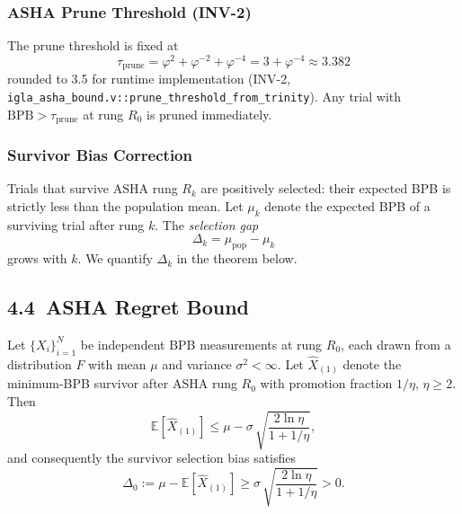 \subsubsection{ASHA Prune Threshold (INV-2)}

The prune threshold is fixed at
\[
  \tau_{\text{prune}} = \varphi^2 + \varphi^{-2} + \varphi^{-4}
    = 3 + \varphi^{-4} \approx 3.382
\]
rounded to 3.5 for runtime implementation (INV-2,
\texttt{igla\_asha\_bound.v::prune\_threshold\_from\_trinity}).
Any trial with \(\mathrm{BPB} > \tau_{\text{prune}}\) at rung \(R_0\) is
pruned immediately.

\subsubsection{Survivor Bias Correction}

Trials that survive ASHA rung \(R_k\) are positively selected: their
expected BPB is strictly less than the population mean.
Let \(\mu_k\) denote the expected BPB of a surviving trial after rung \(k\).
The \emph{selection gap}
\[
  \Delta_k = \mu_{\text{pop}} - \mu_k
\]
grows with \(k\).  We quantify \(\Delta_k\) in the theorem below.

\subsection{4.4\ ASHA Regret Bound}\label{sec:ch26-asha-theorem}

\begin{theorem}\label{thm:asha-regret}
Let \(\{X_i\}_{i=1}^N\) be independent BPB measurements at rung \(R_0\),
each drawn from a distribution \(F\) with mean \(\mu\) and variance
\(\sigma^2 < \infty\).
Let \(\hat{X}_{(1)}\) denote the minimum-BPB survivor after ASHA rung
\(R_0\) with promotion fraction \(1/\eta\), \(\eta \geq 2\).
Then
\[
  \mathbb{E}[\hat{X}_{(1)}] \leq \mu - \sigma\,\sqrt{\frac{2\ln\eta}{1 + 1/\eta}},
\]
and consequently the survivor selection bias satisfies
\[
  \Delta_0 := \mu - \mathbb{E}[\hat{X}_{(1)}]
    \geq \sigma\,\sqrt{\frac{2\ln\eta}{1 + 1/\eta}} > 0.
\]
\end{theorem}

